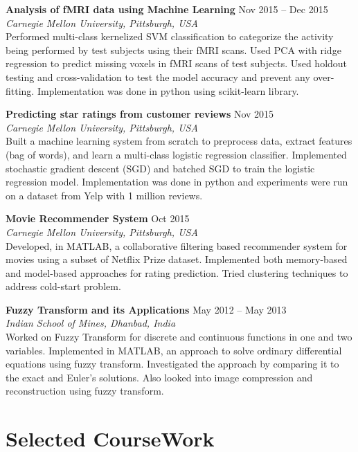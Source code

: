 \documentclass[margin,line]{resume}
\begin{document}
\begin{resume}
		\textbf{Analysis of fMRI data using Machine Learning} \hfill Nov 2015 -- Dec 2015 \\
		\textit{Carnegie Mellon University, Pittsburgh, USA}\\
		 Performed multi-class kernelized SVM classification to categorize the activity being performed by test subjects using their fMRI scans. Used PCA with ridge regression to predict missing voxels in fMRI scans of test subjects. Used holdout testing and cross-validation to test the model accuracy and prevent any over-fitting. Implementation was done in python using scikit-learn library.
  		 
		\textbf{Predicting star ratings from customer reviews} \hfill Nov 2015 \\
  		\textit{Carnegie Mellon University, Pittsburgh, USA}\\
        Built a machine learning system from scratch to preprocess data, extract features (bag of words), and learn a multi-class logistic regression classifier. Implemented stochastic gradient descent (SGD) and batched SGD to train the logistic regression model. Implementation was done in python and experiments were run on a dataset from Yelp with 1 million reviews.

		\textbf{Movie Recommender System} \hfill Oct 2015 \\
  		\textit{Carnegie Mellon University, Pittsburgh, USA} \\
		Developed, in MATLAB, a collaborative filtering based recommender system for movies using a subset of Netflix Prize dataset. Implemented both memory-based and model-based approaches for rating 				prediction. Tried clustering techniques to address cold-start problem. 

		\textbf{Fuzzy Transform and its Applications} \hfill May 2012 -- May 2013 \\
  		\textit{Indian School of Mines, Dhanbad, India} \\
		Worked on Fuzzy Transform for discrete and continuous functions in one and two \mbox{variables}. Implemented in MATLAB, an approach to solve ordinary differential equations using fuzzy transform. Investigated the approach by comparing it to the exact and Euler's solutions. Also looked into image compression and reconstruction using fuzzy transform.

\section{\mysidestyle Selected CourseWork}
	

\end{resume}
\end{document}
